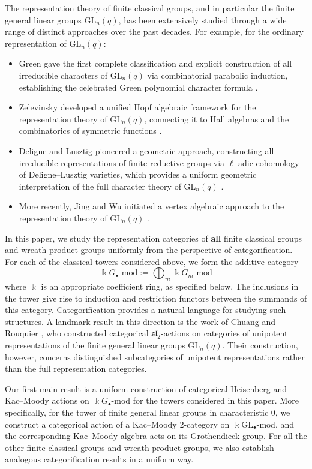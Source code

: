 \documentclass[12pt]{amsart}
\numberwithin{itemcounter}{subsection}
\theoremstyle{plain}
\theoremstyle{definition}
\theoremstyle{remark}
\numberwithin{equation}{section}
\def\k{\Bbbk}
\def\GL{\mathrm{GL}}
\begin{document}
The representation theory of finite classical groups, and in particular the finite general linear groups $\mathrm{GL}_n(q)$, has been extensively studied through a wide range of distinct approaches over the past decades.
For example, for the ordinary representation of $\GL_n(q)$:
\begin{itemize}
    \item Green  gave the first complete classification and explicit construction of all irreducible characters of $\mathrm{GL}_n(q)$ via combinatorial parabolic induction, establishing the celebrated Green polynomial character formula \cite{Green55}.
    \item Zelevinsky developed a unified Hopf algebraic framework for the representation theory of $\mathrm{GL}_n(q)$, connecting it to Hall algebras and the combinatorics of symmetric functions \cite{Zel81}.
    \item Deligne and Lusztig pioneered a geometric approach, constructing all irreducible representations of finite reductive groups via $\ell$-adic cohomology of Deligne--Lusztig varieties, which provides a uniform geometric interpretation of the full character theory of $\mathrm{GL}_n(q)$ \cite{DL76}.
    \item More recently, Jing and Wu initiated a vertex algebraic approach to the representation theory of $\mathrm{GL}_n(q)$ \cite{JW23}.
\end{itemize}

In this paper, we study the representation categories of {\bf all} finite classical
groups and wreath product groups uniformly from the perspective of categorification. For each of the
classical towers considered above, we form the additive category
\[
    \k G_\bullet\text{-mod}
    :=
    \bigoplus_m \k G_m\text{-mod}
\]
where $\k$ is an appropriate coefficient ring, as specified below.
 The inclusions in the tower give rise to induction and restriction functors
between the summands of this category. 
Categorification provides a natural language for studying such structures. A
landmark result in this direction is the work of Chuang and Rouquier
\cite{CR08}, who constructed categorical $\mathfrak{sl}_2$-actions on
categories of unipotent representations of the finite general linear groups
$\GL_n(q)$. Their construction, however, concerns distinguished subcategories
of unipotent representations rather than the full representation categories.

Our first main result is a uniform construction of categorical Heisenberg and Kac--Moody actions on \(\k G_\bullet\)-mod for the towers considered in this paper. More specifically, for the tower of finite general linear groups in characteristic 0, we construct a categorical
action of a Kac--Moody 2-category on
$\k\GL_\bullet\text{-mod}$, and the corresponding Kac--Moody algebra acts on its Grothendieck group. For all the
other finite classical groups and wreath product groups, we also establish analogous categorification results in a uniform way.
\end{document}
